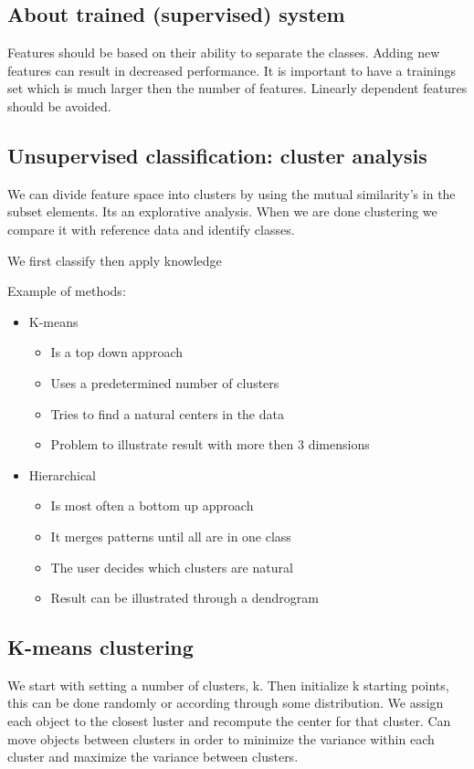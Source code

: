 \subsection*{About trained (supervised) system}
Features should be based on their ability to separate the classes. Adding new features can result in decreased performance. It is important to have a trainings set which is much larger then the number of features. Linearly dependent features should be avoided.



\subsection*{Unsupervised classification: cluster analysis}
We can divide feature space into clusters by using the mutual similarity's in the subset elements. Its an explorative analysis. When we are done clustering we compare it with reference data and identify classes. 

We first classify then apply knowledge 

Example of methods:

\begin{itemize}
	\item K-means
	\begin{itemize}
		\item Is a top down approach 
		\item Uses a predetermined number of clusters
		\item Tries to find a natural centers in the data
		\item Problem to illustrate result with more then 3 dimensions
	\end{itemize}
	\item Hierarchical
	\begin{itemize}
		\item Is most often a bottom up approach
		\item It merges patterns until all are in one class
		\item The user decides which clusters are natural
		\item Result can be illustrated through a dendrogram
	\end{itemize}
\end{itemize}


\subsection*{K-means clustering}
We start with setting a number of clusters, k. Then initialize k starting points, this can be done randomly or according through some distribution. We assign each object to the closest luster and recompute the center for that cluster. Can move objects between clusters in order to minimize the variance within each cluster and maximize the variance between clusters. 

